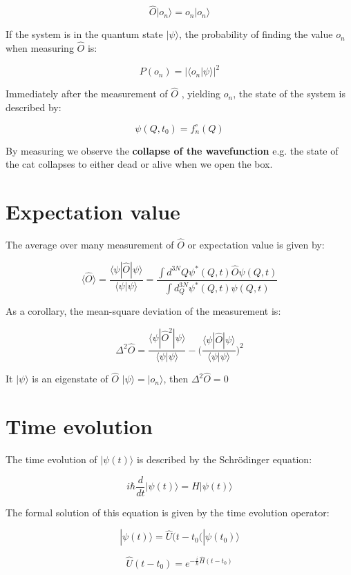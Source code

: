 $$\hat{O}|o_n\rangle = o_n|o_n\rangle$$

If the system is in the quantum state $|\psi\rangle$, the probability of finding the value $o_n$ when measuring $\hat{O}$ is:

$$P(o_n) = |\langle o_n|\psi\rangle|^2$$

Immediately after the measurement of $\hat{O}$ , yielding $o_n$, the state of the system is described by:

$$\psi(Q,t_0)=f_n^{\circ}(Q)$$

By measuring we observe the \textbf{collapse of the wavefunction} e.g. the state of the cat collapses to either dead or alive when we open the box.

\section{Expectation value}
The average over many measurement of $\hat{O}$ or expectation value is given by:

$$\langle \hat{O}\rangle = \frac{\langle\psi|\hat{O}|\psi\rangle}{\langle \psi|\psi\rangle}=\frac{\int d^{3 N} Q \psi^{*}(Q, t) \hat{O} \psi(Q, t)}{\int d_{Q}^{3 N} \psi^{*}(Q, t) \psi(Q, t)}$$

As a corollary,  the mean-square deviation of the measurement is:

$$\Delta^2\hat{O} = \frac{\langle \psi|\hat{O}^2|\psi\rangle}{\langle\psi|\psi\rangle}-\biggl(\frac{\langle\psi|\hat{O}|\psi\rangle}{\langle\psi|\psi\rangle}\biggr)^2$$

It $|\psi\rangle$ is an eigenstate of $\hat{O}$ $|\psi\rangle = |o_n\rangle$, then $\Delta^2\hat{O} = 0$

\section{Time evolution}
The time evolution of $|\psi(t)\rangle$ is described by the Schr\"odinger equation:

$$i\hbar \frac{d{}}{d{t}}|\psi(t)\rangle = H|\psi(t)\rangle$$

The formal solution of this equation is given by the time evolution operator:

$$|\psi(t)\rangle = \hat{U}(t-t_0(|\psi(t_0)\rangle$$

$$\hat{U}(t-t_0) = e^{-\frac{i}{\hbar}\hat{H}(t-t_0)}$$

